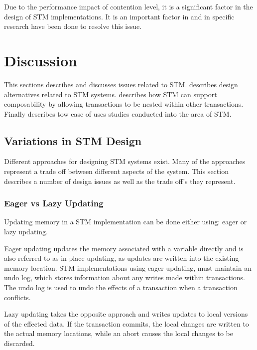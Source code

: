 Due to the performance impact of contention level, it is a significant factor in the design of \ac{STM} implementations. It is an important factor in \cite{harris2003language} and in \cite{herlihy2008transactional} specific research have been done to resolve this issue.

\section{Discussion}
\label{sec:stm_discussion}
This sections describes and discusses issues related to \ac{STM}.  describes design alternatives related to \ac{STM} systems.  describes how \ac{STM} can support composability by allowing transactions to be nested within other transactions. Finally  describes tow ease of uses studies conducted into the area of \ac{STM}.

\subsection{Variations in \ac{STM} Design}\label{subsec:stm:variations_in_design}
Different approaches for designing \ac{STM} systems exist. Many of the approaches represent a trade off between different aspects of the system. This section describes a number of design issues as well as the trade off's they represent.

\subsubsection{Eager vs Lazy Updating}
Updating memory in a \ac{STM} implementation can be done either using: eager or lazy updating.

Eager updating updates the memory associated with a variable directly and is also referred to as in-place-updating, as updates are written into the existing memory location\cite[p. 35]{afek2011lowering}. \ac{STM} implementations using eager updating, must maintain an undo log, which stores information about any writes made within transactions. The undo log is used to undo the effects of a transaction when a transaction conflicts\cite[p. 2084]{herlihy2011tm}.

Lazy updating takes the opposite approach and writes updates to local versions of the effected data\cite[p. 2084]{herlihy2011tm}. If the transaction commits, the local changes are written to the actual memory locations, while an abort causes the local changes to be discarded.

